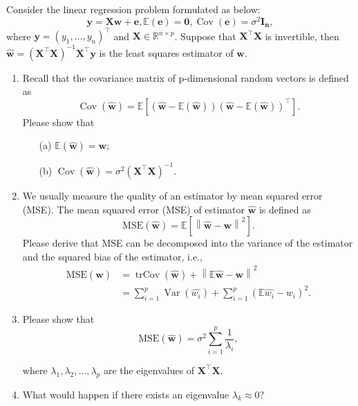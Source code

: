 \documentclass[11pt,letter,notitlepage]{article}
\begin{document}
\newpage
\begin{exercise}[Multicollinearity]
	Consider the linear regression problem formulated as below:
	$$\mathbf{y} = \mathbf{X} \mathbf{ w + e}, \mathbb{E}(\mathbf{e}) = \mathbf{0}, \operatorname{Cov}(\mathbf{e}) = \sigma^2 \mathbf{I_n}, $$where $\mathbf{y}=\left(y_{1}, \ldots, y_{n}\right)^{\top}$ and $\mathbf{X} \in \mathbb{R}^{n \times p}$. Suppose that $\mathbf{X}^{\top}\mathbf{X}$ is invertible, then $\hat{\mathbf{w}} = \left(\mathbf{X}^{\top} \mathbf{X}\right)^{-1} \mathbf{X}^{\top} \mathbf{y}$ is the least squares estimator of $\mathbf{w}$.
	\begin{enumerate}
		\item Recall that the covariance matrix of p-dimensional random vectors is defined as $$\operatorname{Cov}(\hat{\mathbf{w}}) = \mathbb{E}\mathbf{[(\hat{\mathbf{w}}-\mathbb{E}(\hat{\mathbf{w}}))(\hat{\mathbf{w}}-\mathbb{E}(\hat{\mathbf{w}}))^{\top}]}.$$
		Please show that
		\begin{enumerate}
			\item[(a)] $\mathbb{E}(\hat{\mathbf{w}}) = \mathbf{w}$;
			\item[(b)] $\operatorname{Cov}(\hat{\mathbf{w}}) = \sigma^2 \left(\mathbf{X}^{\top} \mathbf{X}\right)^{-1}$.
		\end{enumerate}
		\item We usually measure the quality of an estimator by mean squared error (MSE). The mean squared error (MSE) of estimator $\hat{\mathbf{w}}$ is defined as 	$$\text{MSE}(\hat{\mathbf{w}}) = \mathbb{E}[\left\|\hat{\mathbf{w}} - \mathbf{w}\right
		\|^2] .$$ Please derive that MSE can be decomposed into the variance of the estimator and the squared bias of the estimator, i.e.,
			$$\begin{aligned}
			\text{MSE}(\hat{\mathbf{w}}) &= \operatorname{trCov}(\hat{\mathbf{w}}) + \left\|\mathbb{E}\hat{\mathbf{w}}-\mathbf{w}\right\|^2\\
			&=\sum_{i=1}^{p} \operatorname{Var}(\hat{w_i}) + \sum_{i=1}^{p}  (\mathbb{E} \hat{w_i}-w_i)^2.
		\end{aligned}$$
		\item Please show that
		$$\text{MSE}(\hat{\mathbf{w}}) = \sigma^2 \sum_{i=1}^{p} \frac{1}{\lambda_i},$$
		
		where $\lambda_1,\lambda_2,\ldots,\lambda_{p}$ are the eigenvalues of $\mathbf{X}^{\top} \mathbf{X}$.
		\item What would happen if there exists an eigenvalue $\lambda_k \approx 0$?
	\end{enumerate}
\end{exercise}
\end{document}
